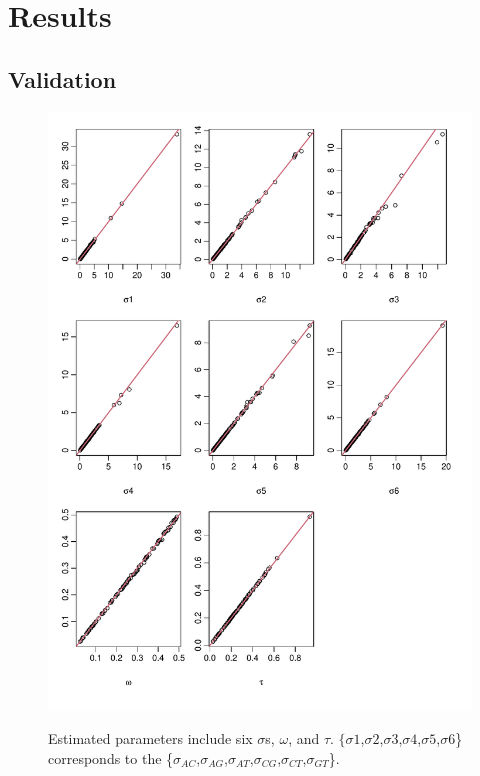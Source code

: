 \section{Results}
\subsection{Validation}

\pagebreak
\begin{figure}[H]
     \begin{minipage}[t]{1\textwidth}
     \includegraphics[width=1\linewidth,height=1.2\linewidth]{Fig2.pdf}
     { Estimated parameters include six $\sigma$s, $\omega$, and $\tau$. $\{\sigma1$,$\sigma2$,$\sigma3$,$\sigma4$,$\sigma5$,$\sigma6$\} corresponds to the \{$\sigma_{AC}$,$\sigma_{AG}$,$\sigma_{AT}$,$\sigma_{CG}$,$\sigma_{CT}$,$\sigma_{GT}$\}. 
      \par}
     \end{minipage}
\end{figure}

